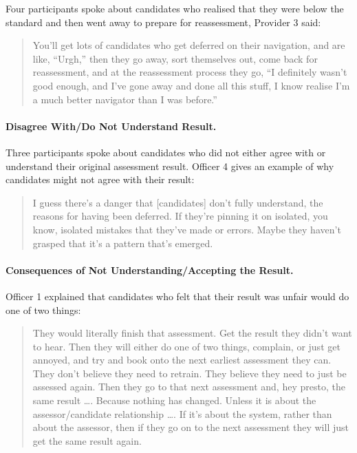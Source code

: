 \documentclass[
  12pt,
  a4paper,
]{book}
\begin{document}
Four participants spoke about candidates who realised that they were below the standard and then went away to prepare for reassessment, Provider 3 said:

\begin{quote}
You'll get lots of candidates who get deferred on their navigation, and are like, ``Urgh,'' then they go away, sort themselves out, come back for reassessment, and at the reassessment process they go, ``I definitely wasn't good enough, and I've gone away and done all this stuff, I know realise I'm a much better navigator than I was before.''
\end{quote}

\hypertarget{disagree-withdo-not-understand-result.}{%
\paragraph{Disagree With/Do Not Understand Result.}\label{disagree-withdo-not-understand-result.}}

Three participants spoke about candidates who did not either agree with or understand their original assessment result. Officer 4 gives an example of why candidates might not agree with their result:

\begin{quote}
I guess there's a danger that {[}candidates{]} don't fully understand, the reasons for having been deferred. If they're pinning it on isolated, you know, isolated mistakes that they've made or errors. Maybe they haven't grasped that it's a pattern that's emerged.
\end{quote}

\hypertarget{consequences-of-not-understandingaccepting-the-result.}{%
\paragraph{Consequences of Not Understanding/Accepting the Result.}\label{consequences-of-not-understandingaccepting-the-result.}}

Officer 1 explained that candidates who felt that their result was unfair would do one of two things:

\begin{quote}
They would literally finish that assessment. Get the result they didn't want to hear. Then they will either do one of two things, complain, or just get annoyed, and try and book onto the next earliest assessment they can. They don't believe they need to retrain. They believe they need to just be assessed again. Then they go to that next assessment and, hey presto, the same result \ldots. Because nothing has changed. Unless it is about the assessor/candidate relationship \ldots. If it's about the system, rather than about the assessor, then if they go on to the next assessment they will just get the same result again.
\end{quote}
\end{document}
